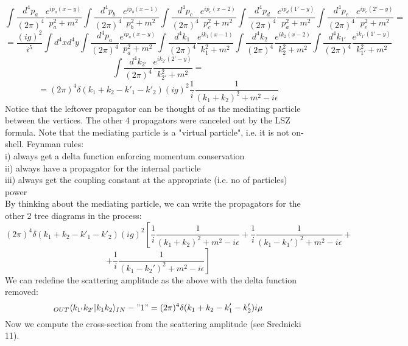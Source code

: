 \documentclass[12 pt]{article}
\begin{document}
\[   \int \frac{d^4 p_a}{(2\pi)^4} \frac{e^{ip_a(x-y)}}{p_a^2+m^2} \int \frac{d^4 p_b}{(2\pi)^4} \frac{e^{ip_b(x-1)}}{p_b^2+m^2} \int \frac{d^4 p_c}{(2\pi)^4} \frac{e^{ip_c(x-2)}}{p_c^2+m^2} \int \frac{d^4 p_d}{(2\pi)^4} \frac{e^{ip_d(1'-y)}}{p_a^2+m^2} \int \frac{d^4 p_e}{(2\pi)^4} \frac{e^{ip_e(2'-y)}}{p_e^2+m^2} =  \]
\[ =    \frac{(ig)^2}{i^5} \int d^4x d^4 y  \int \frac{d^4 p_a}{(2\pi)^4} \frac{e^{ip_a(x-y)}}{p_a^2+m^2} \int \frac{d^4 k_1}{(2\pi)^4} \frac{e^{ik_1(x-1)}}{k_1^2+m^2} \int \frac{d^4 k_2}{(2\pi)^4} \frac{e^{ik_2(x-2)}}{k_2^2+m^2} \int \frac{d^4 k_{1'}}{(2\pi)^4} \frac{e^{ik_{1'}(1'-y)}}{k_{1'}^2+m^2} \]
\[ \int \frac{d^4 k_{2'}}{(2\pi)^4} \frac{e^{ik_{2'}(2'-y)}}{k_{2'}^2+m^2}  =  \]
\[  = (2\pi)^4 \delta(k_1+k_2 - k'_1 - k'_2) (ig)^2 \frac{1}{i} \frac{1}{(k_1+k_2)^2 + m^2 - i \epsilon}   \]
Notice that the leftover propagator can be thought of as the mediating particle between the vertices. The other 4 propagators were canceled out by the LSZ formula. Note that the mediating particle is a "virtual particle", i.e. it is not on-shell. Feynman rules:
\\
i) always get a delta function enforcing momentum conservation
\\
ii) always have a propagator for the internal particle
\\
iii) always get the coupling constant at the appropriate (i.e. no of particles) power
\\
By thinking about the mediating particle, we can write the propagators for the other 2 tree diagrams in the process:
\[  (2\pi)^4 \delta(k_1+k_2 - k'_1 - k'_2) (ig)^2 \left[ \frac{1}{i} \frac{1}{(k_1+k_2)^2 + m^2 - i \epsilon}  + \frac{1}{i} \frac{1}{(k_1-k_1')^2 + m^2 - i \epsilon} +\right. \]
\[ \left. + \frac{1}{i} \frac{1}{(k_1-k_2')^2 + m^2 - i \epsilon} \right] \]
We can redefine the scattering amplitude as the above with the delta function removed:
\[    _{OUT}\langle k_{1'} k_{2'} | k_1 k_2 \rangle_{IN} -  "1" = (2\pi)^4 \delta(k_1+k_2 - k'_1 - k'_2) i\mu    \]
Now we compute the cross-section from the scattering amplitude (see Srednicki 11).
\end{document}
